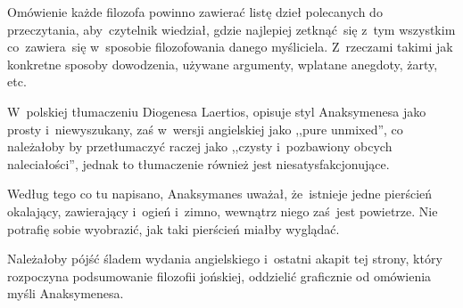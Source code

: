 \documentclass[a4paper,11pt]{article}
\begin{document}
\vspace{\spaceTwo}





\newpage
{}

\vspace{\spaceFour}






\noi {}

\vspace{\spaceFour}

\start Omówienie każde filozofa powinno zawierać listę dzieł
polecanych do przeczytania, aby~czytelnik wiedział, gdzie najlepiej
zetknąć~się z~tym wszystkim co~zawiera~się w~sposobie filozofowania
danego myśliciela. Z~rzeczami takimi jak konkretne sposoby dowodzenia,
używane argumenty, wplatane anegdoty, żarty, etc.

\vspace{\spaceThree}


\noi {}

\vspace{\spaceFour}

\start {} W~polskiej tłumaczeniu Diogenesa Laertios, opisuje
styl Anaksymenesa jako prosty i~niewyszukany, zaś w~wersji angielskiej
jako ,,pure unmixed'', co należałoby by przetłumaczyć raczej jako
,,czysty i~pozbawiony obcych naleciałości'', jednak to tłumaczenie
również jest niesatysfakcjonujące.

\vspace{\spaceFour}


\start {} Według tego co tu napisano, Anaksymanes uważał,
że~istnieje jedne pierścień okalający, zawierający i~ogień i~zimno,
wewnątrz niego zaś~jest powietrze. Nie potrafię sobie wyobrazić, jak
taki pierścień miałby wyglądać.

\vspace{\spaceFour}


\start {} Należałoby pójść śladem wydania angielskiego i~ostatni
akapit tej strony, który rozpoczyna podsumowanie filozofii jońskiej,
oddzielić graficznie od omówienia myśli Anaksymenesa.
\end{document}
